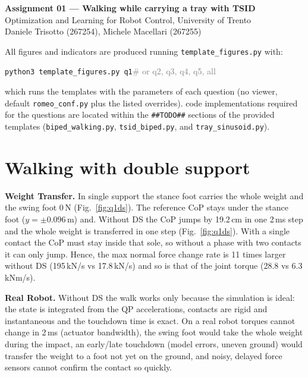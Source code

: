 \documentclass[10pt,a4paper]{article}
\newcommand{\fig}[1]{Fig.~\ref{fig:#1}}
\newcommand{\code}[1]{\texttt{#1}}
\begin{document}
\begin{center}
  {\large\bfseries Assignment 01 --- Walking while carrying a tray with TSID}\\[2pt]
  Optimization and Learning for Robot Control, University of Trento\\[2pt]
  Daniele Trisotto (267254), \quad Michele Macellari (267255)
\end{center}


All figures and indicators are produced running \texttt{template\_figures.py} with:
\begin{center}
  \colorbox{gray!12}{\strut\enspace\texttt{python3 template\_figures.py q1}\quad\textcolor{gray}{\# or q2, q3, q4, q5, all}\enspace}
\end{center}
which runs the templates with the parameters of each question (no viewer, default \code{romeo\_conf.py} plus the listed overrides). code implementations required for the questions are located within the \texttt{\#\#TODO\#\#} sections of the provided templates (\texttt{biped\_walking.py}, \texttt{tsid\_biped.py}, and \texttt{tray\_sinusoid.py}).

\section{Walking with double support}
\textbf{Weight Transfer.} In single support the stance foot carries the whole weight and the swing foot 0\,N (\fig{q1ds}). The reference CoP stays under the stance foot ($y=\pm0.096$\,m) and. Without DS the CoP jumps by 19.2\,cm in one 2\,ms step and the whole weight is transferred in one step (\fig{q1ds}). With a single contact the CoP must stay inside that sole, so without a phase with two contacts it can only jump. Hence, the max normal force change rate is 11 times larger without DS (195\,kN/s vs 17.8\,kN/s) and so is that of the joint torque (28.8 vs 6.3\,kNm/s).

\textbf{Real Robot.} Without DS the walk works only because the simulation is ideal: the state is integrated from the QP accelerations, contacts are rigid and instantaneous and the touchdown time is exact. On a real robot torques cannot change in 2\,ms (actuator bandwidth), the swing foot would take the whole weight during the impact, an early/late touchdown (model errors, uneven ground) would transfer the weight to a foot not yet on the ground, and noisy, delayed force sensors cannot confirm the contact so quickly.
\end{document}
